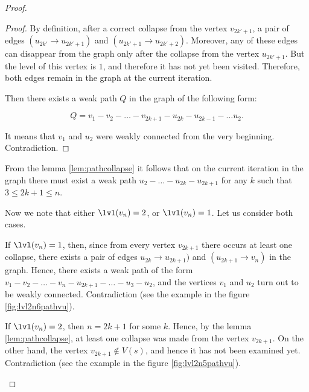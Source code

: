 \begin{proof}
\begin{proof}
By definition, after a correct collapse from the vertex $ v_{2k '+ 1} $, a pair of edges $ (u_{2k'} \to u_{2k '+ 1}) $ and $ (u_{2k' + 1} \to u_{2k '+ 2}) $. Moreover, any of these edges can disappear from the graph only after the collapse from the vertex $ u_ {2k '+ 1} $. But the level of this vertex is $ 1 $, and therefore it has not yet been visited. Therefore, both edges remain in the graph at the current iteration.

Then there exists a weak path $ Q $ in the graph of the following form:

$$
Q = v_1 - v_2 - \ldots - v_{2k+1} - u_{2k} - u_{2k-1} - \ldots u_2.
$$

It means that $v_1$ and $u_2$ were weakly connected from the very beginning. Contradiction.
\end{proof}

From the lemma \ref{lem:pathcollapse} it follows that on the current iteration in the graph there must exist a weak path $ u_2 - \ldots - u_{2k} - u_{2k + 1} $ for any $ k $ such that $ 3 \le 2k + 1 \le n $.

Now we note that either $ \lvl (v_{n}) = 2 $, or $ \lvl (v_{n}) = 1 $. Let us consider both cases.

If $ \lvl (v_{n}) = 1 $, then, since from every vertex $ v_{2k + 1} $ there occurs at least one collapse, there exists a pair of edges $ u_{2k} \to u_{2k + 1} ) $ and $ (u_{2k + 1} \to v_n) $ in the graph. Hence, there exists a weak path of the form $ v_1 - v_2 - \ldots - v_n - u_{2k + 1} - \ldots - u_3 - u_2 $, and the vertices $ v_1 $ and $ u_2 $ turn out to be weakly connected. Contradiction (see the example in the figure \ref {fig:lvl2n6pathvu}).

If $ \lvl (v_{n}) = 2 $, then $ n = 2k + 1 $ for some $ k $. Hence, by the lemma \ref{lem:pathcollapse}, at least one collapse was made from the vertex $ v_{2k + 1} $. On the other hand, the vertex $ v_{2k + 1} \notin V (s) $, and hence it has not been examined yet. Contradiction (see the example in the figure \ref{fig:lvl2n5pathvu}).

\begin{figure}[ht]
\begin{center}

\end{center}
\end{figure}
\end{proof}
